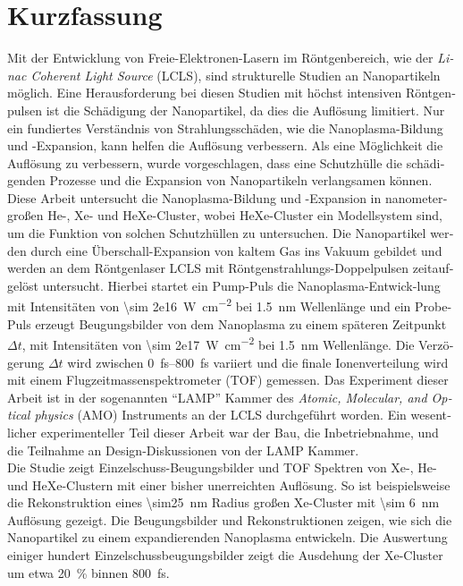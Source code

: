 \section*{Kurzfassung}
\begin{otherlanguage}{german}
Mit der Entwicklung von Freie-Elektronen-Lasern im Röntgenbereich, wie der \textit{Linac Coherent Light Source} (LCLS), sind strukturelle Studien an Nanopartikeln möglich. Eine Herausforderung bei diesen Studien mit höchst intensiven Röntgenpulsen ist die Schädigung der Nanopartikel, da dies die Auflösung limitiert. Nur ein fundiertes Verständnis von Strahlungsschäden, wie die Nanoplasma-Bildung und -Expansion, kann helfen die Auflösung verbessern. Als eine Möglichkeit die Auflösung zu verbessern, wurde vorgeschlagen, dass eine Schutzhülle die schädigenden Prozesse und die Expansion von Nanopartikeln verlangsamen können.\\[0.6\baselineskip]
%
Diese Arbeit untersucht die Nanoplasma-Bildung und -Expansion in nanometergroßen He-, Xe- und HeXe-Cluster, wobei HeXe-Cluster ein Modellsystem sind, um die Funktion von solchen Schutzhüllen zu untersuchen. Die Nanopartikel werden durch eine Überschall-Expansion von kaltem Gas ins Vakuum gebildet und werden an dem Röntgenlaser LCLS mit Röntgenstrahlungs-Doppelpulsen zeitaufgelöst untersucht. Hierbei startet ein Pump-Puls die Nanoplasma-Entwick-lung mit Intensitäten von \SI{\sim 2e16}{\watt\per\square\centi\meter} bei \SI{1.5}{\nano\meter} Wellenlänge und ein Probe-Puls erzeugt Beugungsbilder von dem Nanoplasma zu einem späteren Zeitpunkt $\Delta t$, mit Intensitäten von \SI{\sim 2e17}{\watt\per\square\centi\meter} bei \SI{1.5}{\nano\meter} Wellenlänge. Die Verzögerung $\Delta t$ wird zwischen \SIrange{0}{800}{\femto\second} variiert und die finale Ionenverteilung wird mit einem Flugzeitmassenspektrometer (TOF) gemessen. Das Experiment dieser Arbeit ist in der sogenannten ``LAMP'' Kammer des \textit{Atomic, Molecular, and Optical physics} (AMO) Instruments an der LCLS durchgeführt worden. Ein wesentlicher experimenteller Teil dieser Arbeit war der Bau, die Inbetriebnahme, und die Teilnahme an Design-Diskussionen von der LAMP Kammer.\\[0.6\baselineskip]
%
Die Studie zeigt Einzelschuss-Beugungsbilder und TOF Spektren von Xe-, He- und HeXe-Clustern mit einer bisher unerreichten Auflösung. So ist beispielsweise die Rekonstruktion eines \SI{\sim25}{\nano\meter} Radius großen Xe-Cluster mit \SI{\sim 6}{\nano\meter} Auflösung gezeigt. Die Beugungsbilder und Rekonstruktionen zeigen, wie sich die Nanopartikel zu einem expandierenden Nanoplasma entwickeln. Die Auswertung einiger hundert Einzelschussbeugungsbilder zeigt die Ausdehung der Xe-Cluster um etwa \SI{20}{\percent} binnen \SI{800}{\femto\second}. 

\end{otherlanguage}
